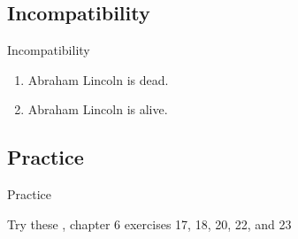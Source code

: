 \documentclass{beamer}
\newcommand{\subonefour}{Incompatibility}
\newcommand{\subonefive}{Practice}
\begin{document}
    \subsection{\subonefour}
      \begin{frame}{\subonefour}
        \begin{definition}
          
        \end{definition}
        \begin{example}
          \begin{enumerate}
            \item Abraham Lincoln is dead.
            \item Abraham Lincoln is alive.
          \end{enumerate}
        \end{example}
      \end{frame}

    \subsection{\subonefive}
      \begin{frame}{\subonefive}
        \begin{block}{Try these}
          \textcite{dawson_language_2016}, chapter 6 exercises 17, 18, 20, 22, and 23
        \end{block}
      \end{frame}
\end{document}
